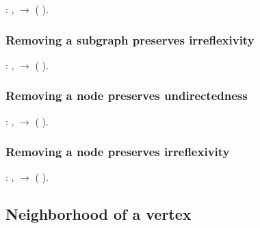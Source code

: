 \begin{coqdoccode}
\coqdocemptyline
\coqdocnoindent
{}  : \coqdockw{\ensuremath{\forall}}  ,   \ensuremath{\rightarrow}  (  ).\coqdoceol
\coqdocemptyline
\end{coqdoccode}
\subsubsection{Removing a subgraph preserves irreflexivity}


\begin{coqdoccode}
\coqdocemptyline
\coqdocnoindent
{}  : \coqdockw{\ensuremath{\forall}}  ,   \ensuremath{\rightarrow}  (  ).\coqdoceol
\coqdocemptyline
\end{coqdoccode}
\subsubsection{Removing a node preserves undirectedness}


\begin{coqdoccode}
\coqdocemptyline
\coqdocnoindent
{}  : \coqdockw{\ensuremath{\forall}}  ,   \ensuremath{\rightarrow}  (  ).\coqdoceol
\coqdocemptyline
\end{coqdoccode}
\subsubsection{Removing a node preserves irreflexivity}


\begin{coqdoccode}
\coqdocemptyline
\coqdocnoindent
{}  : \coqdockw{\ensuremath{\forall}}  ,   \ensuremath{\rightarrow}  (  ).\coqdoceol
\coqdocemptyline
\end{coqdoccode}
\subsection{Neighborhood of a vertex}

